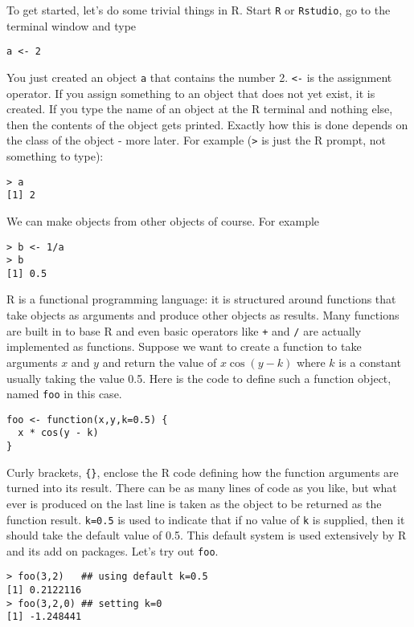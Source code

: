 \documentclass[10pt] {article}
\theoremstyle{definition}
\begin{document}
To get started, let's do some trivial things in R. Start {\tt R} or {\tt Rstudio}, go to the terminal window and type
\begin{lstlisting}
a <- 2
\end{lstlisting}
You just created an object {\tt a} that contains the number 2. \lstinline+<-+ is the assignment operator. If you assign something to an object that does not yet exist, it is created. If you type the name of an object at the R terminal and nothing else, then the contents of the object gets printed. Exactly how this is done depends on the class of the object - more later. For example (\lstinline+>+ is just the R prompt, not something to type): 
\begin{lstlisting}
> a
[1] 2
\end{lstlisting}
We can make objects from other objects of course. For example
\begin{lstlisting}
> b <- 1/a
> b
[1] 0.5
\end{lstlisting}

R is a functional programming language: it is structured around functions that take objects as arguments and produce other objects as results. Many functions are built in to base R and even basic operators like \lstinline^+^ and \lstinline+/+ are actually implemented as functions. Suppose we want to create a function to take arguments $x$ and $y$ and return the value of $x \cos(y - k)$ where $k$ is a constant usually taking the value 0.5. Here is the code to define such a function object, named {\tt foo} in this case. 
\begin{lstlisting}
foo <- function(x,y,k=0.5) {
  x * cos(y - k)
}
\end{lstlisting}
Curly brackets, \lstinline+{}+, enclose the R code defining how the function arguments are turned into its result. There can be as many lines of code as you like, but what ever is produced on the last line is taken as the object to be returned as the function result. \lstinline+k=0.5+ is used to indicate that if no value of {\tt k} is supplied, then it should take the default value of 0.5. This default system is used extensively by R and its add on packages. Let's try out {\tt foo}. 
\begin{lstlisting}
> foo(3,2)   ## using default k=0.5
[1] 0.2122116
> foo(3,2,0) ## setting k=0
[1] -1.248441
\end{lstlisting}
\end{document}
